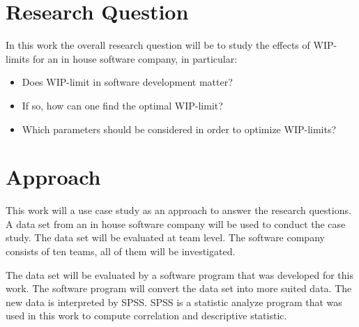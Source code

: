 \documentclass[UKenglish]{ifimaster}  %
\begin{document}
\section{Research Question}
\label{chap:RQ}
In this work the overall research question will be to study the effects of WIP-limits for an in house software company, in particular:
\begin{itemize}
\item Does WIP-limit in software development matter?
\item If so, how can one find the optimal WIP-limit?
\item Which parameters should be considered in order to optimize WIP-limits? 
\end{itemize}


\section{Approach}
This work will a use case study as an approach  to answer the research questions.  A data set from an in house software company will be used to conduct the case study.  The data set will be evaluated at team level. The software company consists of ten teams, all of them will be investigated.

The data set will be evaluated by a software program that was developed for this work. The software program will convert the data set into more suited data. The new data is interpreted by SPSS. SPSS is a statistic analyze program that was used in this work to compute correlation and descriptive statistic. 
\end{document}
